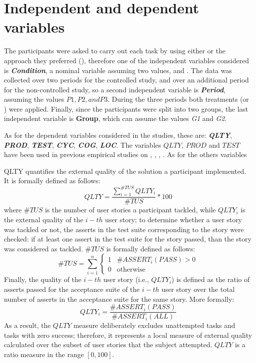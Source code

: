 \section{Independent and dependent variables}
The participants were asked to carry out each task by using either \tdd or the approach they preferred (\notdd), therefore one of the independent variables considered is \textbf{\textit{Condition}}, a nominal variable assuming two values, \tdd and \notdd. The data was collected over two periods for the controlled study, and over an additional period for the non-controlled study, so a second independent variable is \textbf{\textit{Period}}, assuming the values $P1, P2, and P3$. During the three periods both treatments (\tdd or \notdd) were applied. Finally, since the participants were split into two groups, the last independent variable is \textbf{Group}, which can assume the values \textit{G1} and \textit{G2}.


As for the dependent variables considered in the studies, these are: \textbf{\textit{QLTY}}, \textbf{\textit{PROD}}, \textbf{\textit{TEST}}, \textbf{\textit{CYC}}, \textbf{\textit{COG}}, \textbf{\textit{LOC}}.
The variables $QLTY$, $PROD$ and $TEST$ have been used in previous empirical studies on \noess \cite{DBLP:journals/tse/ErdogmusMT05}, \cite{DBLP:journals/tse/FucciETOJ17}, \cite{DBLP:conf/esem/Fucci0BCSTJ18}, \cite{DBLP:journals/ese/TosunDFVTESOTJJ17}. As for the others variables

QLTY quantifies the external quality of the solution a participant implemented. It is formally defined as follows: 
\[
    QLTY = \frac{\sum_{i=1}^{\#TUS} QLTY_i}{\#TUS} * 100 
\]
where $\#TUS$ is the number of user stories a participant tackled, while $QLTY_i$ is the external quality of the $i-th$ user story; to determine whether a user story was tackled or not, the asserts in the test suite corresponding to the story were checked: if at least one assert in the test suite for the story passed, than the story was considered as tackled. $\#TUS$ is formally defined as follows:
\[
    \#TUS = \sum_{i=1}^{n} 
        \begin{cases}
            1 & \text{$\#ASSERT_i(PASS) > 0$}\\
                0 & \text{otherwise}
        \end{cases}
\]
Finally, the quality of the $i-th$ user story (i.e., $QLTY_i$) is defined as the ratio of asserts passed for the acceptance suite of the $i-th$ user story over the total number of asserts in the acceptance suite for the same story. More formally:
\[
    QLTY_i = \frac{\#ASSERT_i(PASS)}{\#ASSERT_i(ALL)}
\]
As a result, the $QLTY$ measure deliberately excludes unattempted tasks and tasks with zero success; therefore, it represents a local measure of external quality calculated over the subset of user stories that the subject attempted. $QLTY$ is a ratio measure in the range $[0, 100]$.

